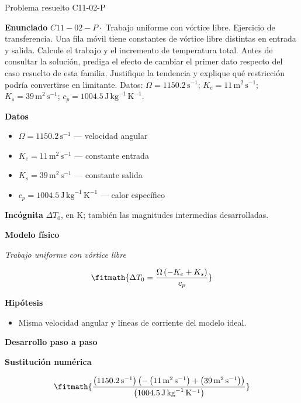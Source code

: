 \documentclass[10pt,openany]{book}
\begin{document}
\begin{studiumworked}{Problema resuelto C11-02-P}


\noindent\textbf{Enunciado}
\(C11-02-P \cdot\) Trabajo uniforme con vórtice libre. Ejercicio de transferencia. Una fila móvil tiene constantes de vórtice libre distintas en entrada y salida. Calcule el trabajo y el incremento de temperatura total. Antes de consultar la solución, prediga el efecto de cambiar el primer dato respecto del caso resuelto de esta familia. Justifique la tendencia y explique qué restricción podría convertirse en limitante. Datos: \(\Omega=1150.2\, \mathrm{s}^{-1}\); \(K_e=11\, \mathrm{m}^{2}\,\mathrm{s}^{-1}\); \(K_s=39\, \mathrm{m}^{2}\,\mathrm{s}^{-1}\); \(c_p=1004.5\, \mathrm{J}\,\mathrm{kg}^{-1}\,\mathrm{K}^{-1}\).

\noindent\textbf{Datos}
\begin{itemize}
\item $\Omega = 1150.2\,\mathrm{s}^{-1}$ — velocidad angular
\item $K_e = 11\,\mathrm{m}^{2}\,\mathrm{s}^{-1}$ — constante entrada
\item $K_s = 39\,\mathrm{m}^{2}\,\mathrm{s}^{-1}$ — constante salida
\item $c_p = 1004.5\,\mathrm{J}\,\mathrm{kg}^{-1}\,\mathrm{K}^{-1}$ — calor específico
\end{itemize}

\noindent\textbf{Incógnita}
$\Delta T_0$, en $\mathrm{K}$; también las magnitudes intermedias desarrolladas.

\noindent\textbf{Modelo físico}

\noindent\textit{Trabajo uniforme con vórtice libre}

\[
\fitmath{\Delta T_0=\frac{\Omega \left(- K_e + K_s\right)}{c_p}}
\]

\noindent\textbf{Hipótesis}
\begin{itemize}
\item Misma velocidad angular y líneas de corriente del modelo ideal.
\end{itemize}

\noindent\textbf{Desarrollo paso a paso}



\noindent\textbf{Sustitución numérica}

\[
\fitmath{\frac{\left(1150.2\,\mathrm{s}^{-1}\right) \left(- \left(11\,\mathrm{m}^{2}\,\mathrm{s}^{-1}\right) + \left(39\,\mathrm{m}^{2}\,\mathrm{s}^{-1}\right)\right)}{\left(1004.5\,\mathrm{J}\,\mathrm{kg}^{-1}\,\mathrm{K}^{-1}\right)}}
\]


\end{studiumworked}
\end{document}
